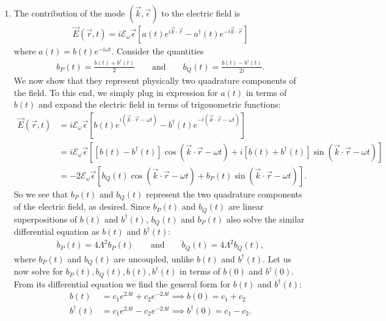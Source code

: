 \documentclass{article}
\theoremstyle{definition}
\newcommand{\f}[2]{\frac{#1}{#2}}
\newcommand{\lb}{\left[}
\newcommand{\rb}{\right]}
\begin{document}
\begin{enumerate}[label=(\alph*)]
\item The contribution of the mode $(\vec{k}, \vec{\epsilon})$ to the electric field is 
\begin{align*}
\vec{E}(\vec{r},t) = i\mathcal{E}_\omega \vec{\epsilon} \lb a(t) e^{i\vec{k}\cdot \vec{r}} - a^\dagger(t) e^{-i \vec{k} \cdot \vec{r}} \rb
\end{align*}
where $a(t) = b(t) e^{-i\omega t}$.  Consider the quantities
\begin{align*}
b_P(t) = \f{b(t) + b^\dagger(t)}{2} \quad\quad \text{and} \quad\quad  b_Q(t) = \f{b(t) -b^\dagger(t)}{2i}.
\end{align*}
We now show that they represent physically two quadrature components of the field. To this end, we simply plug in expression for $a(t)$ in terms of $b(t)$ and expand the electric field in terms of trigonometric functions:
\begin{align*}
\vec{E}(\vec{r},t) 
&= i\mathcal{E}_\omega \vec{\epsilon} \lb  b(t) e^{i (\vec{k}\cdot \vec{r} -  \omega t)}  - b^\dagger(t) e^{-i(\vec{k}\cdot \vec{r} - \omega t)}   \rb \\ 
&= i\mathcal{E}_\omega \vec{\epsilon} \lb [b(t) - b^\dagger(t)] \cos(\vec{k}\cdot \vec{r} - \omega t) + i[b(t) + b^\dagger(t)] \sin(\vec{k}\cdot \vec{r} - \omega t)   \rb \\ 
&= -2\mathcal{E}_\omega \vec{\epsilon} \lb   b_Q(t) \cos(\vec{k}\cdot \vec{r} - \omega t)  +  b_P(t) \sin(\vec{k}\cdot \vec{r} - \omega t)  \rb.
\end{align*}
So we see that $b_P(t)$ and $b_Q(t)$ represent the two quadrature components of the electric field, as desired. Since $b_P(t)$ and $b_Q(t)$ are linear superpositions of $b(t)$ and $b^\dagger(t)$, $b_Q(t)$ and $b_P(t)$ also solve the similar differential equation as $b(t)$ and $b^\dagger(t)$:
\begin{align*}
\ddot{b}_P(t) = 4\Lambda^2 b_P(t) \quad\quad \text{and} \quad\quad \ddot{b}_Q(t) = 4\Lambda^2 b_Q(t),
\end{align*}
where $b_P(t)$ and $b_Q(t)$ are uncoupled, unlike $b(t)$ and $b^\dagger(t)$. Let us now solve for $b_P(t), b_Q(t), b(t), b^\dagger(t)$ in terms of $b(0)$ and $b^\dagger(0)$. From its differential equation we find the general form for $b(t)$ and $b^\dagger(t)$:
\begin{align*}
b(t)               &= c_1 e^{2\Lambda t} + c_2 e^{-2\Lambda t} \implies b(0) = c_1 + c_2\\
b^\dagger(t) &= c_1 e^{2\Lambda t} - c_2 e^{-2\Lambda t} \implies b^\dagger(0) = c_1 - c_2.
\end{align*}

\end{enumerate}
\end{document}
